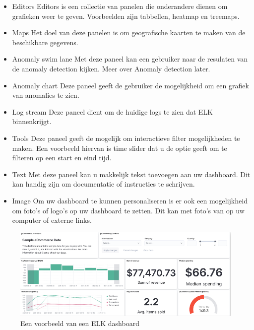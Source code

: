 \begin{itemize}
    \item Editors
        Editors is een collectie van panelen die onderandere dienen om grafieken weer te geven. Voorbeelden zijn tabbellen, heatmap en treemaps. 
    \item Maps
        Het doel van deze panelen is om geografische kaarten te maken van de beschikbare gegevens.

    \item Anomaly swim lane
        Met deze paneel kan een gebruiker naar de resulaten van de anomaly detection kijken. Meer over Anomaly detection later.
        
    \item Anomaly chart
       Deze paneel geeft de gebruiker de mogelijkheid om een grafiek van anomalies te zien.
        
    \item Log stream
        Deze paneel dient om de huidige logs te zien dat ELK binnenkrijgt.

    \item Tools
        Deze paneel geeft de mogelijk om interactieve filter mogelijkheden te maken. Een voorbeeld hiervan is time slider dat u de optie geeft om te filteren op een start en eind tijd.

    \item Text
        Met deze paneel kan u makkelijk tekst toevoegen aan uw dashboard. Dit kan handig zijn om documentatie of instructies te schrijven.

    \item Image
        Om uw dashboard te kunnen personaliseren is er ook een mogelijkheid om foto's of logo's op uw dashboard te zetten. Dit kan met foto's van op uw computer of externe links.
\end{itemize}


\begin{figure}[h]
    \centering
    \includegraphics[width=0.75\linewidth]{bachproef//graphics/Voorbeeld_Dashboard.png}
    \caption{Een voorbeeld van een ELK dashboard ~\autocite{Eleanor2023}}
    \label{fig:een voorbeeld van een ELK dashboard}
\end{figure}

